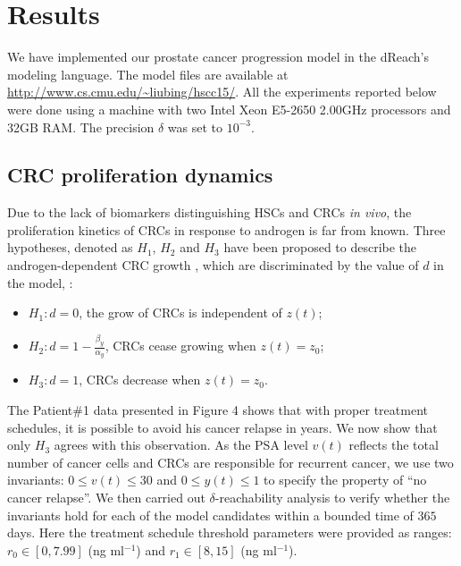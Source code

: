 \section{Results}\label{sec.results}

We have implemented our prostate cancer progression model in the dReach's modeling language. The model files are available at \url{http://www.cs.cmu.edu/~liubing/hscc15/}. All the experiments reported below were done using a machine with two Intel Xeon E5-2650 2.00GHz processors and 32GB RAM. The precision $\delta$ was set to $10^{-3}$. 

\subsection{CRC proliferation dynamics}
Due to the lack of biomarkers distinguishing HSCs and CRCs \textit{in vivo}, the proliferation kinetics of CRCs in response to androgen is far from known. Three hypotheses, denoted as $H_1$, $H_2$ and $H_3$ have been proposed to describe the androgen-dependent CRC growth \cite{ideta08}, which are discriminated by the value of $d$ in the model, \ie:
\begin{itemize}
\item $H_1: d = 0$, the grow of CRCs is independent of $z(t)$;
\item $H_2: d = 1-\frac{\beta_y}{\alpha_y}$, CRCs cease growing when $z(t)=z_0$;
\item $H_3: d = 1$, CRCs decrease when $z(t)=z_0$.
\end{itemize} 

The Patient\#1 data presented in Figure 4 shows that with proper treatment schedules, it is possible to avoid his cancer relapse in years. We now show that only $H_3$ agrees with this observation. As the PSA level $v(t)$ reflects the total number of cancer cells and CRCs are responsible for recurrent cancer, we use two invariants: $0 \le v(t) \le 30$ and $0 \le y(t) \le 1$ to specify the property of ``no cancer relapse''. We then carried out $\delta$-reachability analysis to verify whether the invariants hold for each of the model candidates within a bounded time of $365$ days. Here the treatment schedule threshold parameters were provided as ranges: $r_0 \in [0, 7.99]$ (ng ml$^{-1}$) and $r_1 \in [8,15]$ (ng ml$^{-1}$).


